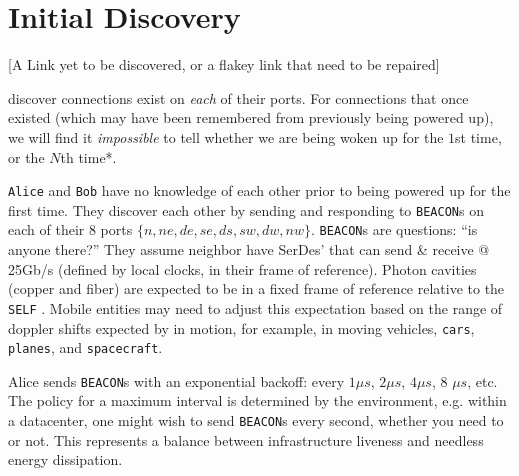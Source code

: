 \documentclass[../../../OAE-SPEC-MAIN.tex]{subfiles}
\begin{document}
\section{Initial Discovery}

[A Link yet to be discovered, or a flakey link that need to be repaired]

\CELLs discover connections exist on \emph{each} of their ports. For connections that once existed (which may have been remembered from previously being powered up), we will find it \emph{impossible} to tell whether we are being woken up for the $1$st time, or the $N$th time*. 


\texttt{Alice} and \texttt{Bob} have no knowledge of each other prior to being powered up for the first time. They discover each other by sending and responding to \texttt{BEACON}s on each of their 8 ports $\{n,ne,de,se,ds,sw,dw,nw\}$. \texttt{BEACON}s are questions: ``is anyone there?'' They assume  neighbor \CELLs have SerDes' that can send \& receive @ 25Gb/s (defined by local clocks, in their frame of reference). Photon cavities (copper and fiber) are expected to be in a fixed frame of reference relative to the \texttt{SELF} \CELL.  Mobile entities may need to adjust this expectation based on the range of doppler shifts expected by \CELLs in motion, for example, in moving vehicles, \texttt{cars}, \texttt{planes}, and \texttt{spacecraft}.


Alice sends \texttt{BEACON}s with an exponential backoff: every $1\mu s$, $2 \mu s$, $4 \mu s$, 8 $\mu s$, etc. The  policy for a maximum interval  is determined by the environment, e.g. within a datacenter, one might wish to send  \texttt{BEACON}s every second, whether you need to or not.  This  represents a balance between infrastructure liveness and needless energy dissipation.
\end{document}
